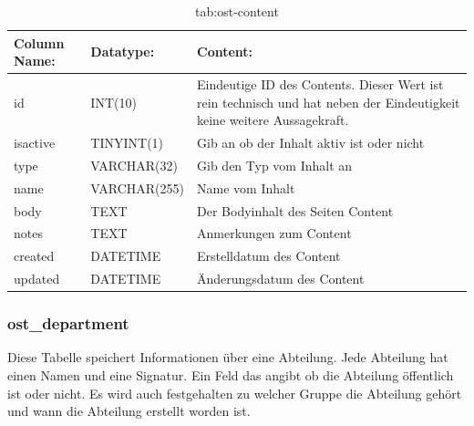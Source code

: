\begin{table}[h]
	\begin{tabular}{|p{3.5cm}|p{4cm}|p{6.2cm}|}
		\hline
		\textbf{Column Name:} & \textbf{Datatype:} & \textbf{Content:}\\
		\hline
		id & INT(10) & Eindeutige ID des Contents. Dieser Wert ist rein technisch und hat  neben der Eindeutigkeit keine weitere 
		Aussagekraft.\\
		\hline
		isactive & TINYINT(1) & Gib an ob der Inhalt aktiv ist oder nicht\\
		\hline
		type & VARCHAR(32) & Gib den Typ vom Inhalt an\\
		\hline
		name & VARCHAR(255) & Name vom Inhalt\\
		\hline
		body & TEXT & Der Bodyinhalt des Seiten Content\\
		\hline
		notes & TEXT & Anmerkungen zum Content\\
		\hline
		created & DATETIME & Erstelldatum des Content\\
		\hline
		updated & DATETIME & Änderungsdatum des Content\\
		\hline
	\end{tabular}
	\caption{tab:ost-content}
\end{table}
\label{tab:ost_content}

\newpage

\subsubsection{ost\_department}

Diese Tabelle speichert Informationen über eine Abteilung. Jede Abteilung hat einen Namen und eine Signatur. Ein Feld das angibt ob die Abteilung öffentlich ist oder nicht. Es wird auch festgehalten zu welcher Gruppe die Abteilung gehört und wann die Abteilung erstellt worden ist.


